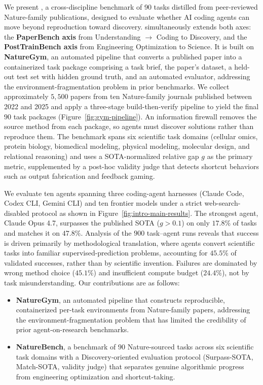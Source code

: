 We present \textbf{\benchmark}, a cross-discipline benchmark of 90 tasks distilled from peer-reviewed Nature-family publications, designed to evaluate whether AI coding agents can move beyond reproduction toward discovery.
\benchmark simultaneously extends both axes: the \textbf{PaperBench axis} from Understanding $\to$ Coding to Discovery, and the \textbf{PostTrainBench axis} from Engineering Optimization to Science.
It is built on \textbf{NatureGym}, an automated pipeline that converts a published paper into a containerized task package comprising a task brief, the paper's dataset, a held-out test set with hidden ground truth, and an automated evaluator, addressing the environment-fragmentation problem in prior benchmarks.
We collect approximately $5{,}500$ papers from ten Nature-family journals published between 2022 and 2025 and apply a three-stage build-then-verify pipeline to yield the final $90$ task packages (Figure~\ref{fig:gym-pipeline}).
An information firewall removes the source method from each package, so agents must discover solutions rather than reproduce them.
The benchmark spans six scientific task domains (cellular omics, protein biology, biomedical modeling, physical modeling, molecular design, and relational reasoning) and uses a SOTA-normalized relative gap $g$ as the primary metric, supplemented by a post-hoc validity judge that detects shortcut behaviors such as output fabrication and feedback gaming.

We evaluate ten agents spanning three coding-agent harnesses (Claude Code, Codex CLI, Gemini CLI) and ten frontier models under a strict web-search-disabled protocol as shown in Figure~\ref{fig:intro-main-results}.
The strongest agent, Claude Opus 4.7, surpasses the published SOTA ($g > 0.1$) on only $17.8\%$ of tasks and matches it on $47.8\%$.
Analysis of the $900$ task--agent runs reveals that success is driven primarily by methodological translation, where agents convert scientific tasks into familiar supervised-prediction problems, accounting for $45.5\%$ of validated successes, rather than by scientific invention.
Failures are dominated by wrong method choice ($45.1\%$) and insufficient compute budget ($24.4\%$), not by task misunderstanding.
Our contributions are as follows:
\begin{itemize}[leftmargin=1em, itemsep=2pt, topsep=4pt]
    \item \textbf{NatureGym}, an automated pipeline that constructs reproducible, containerized per-task environments from Nature-family papers, addressing the environment-fragmentation problem that has limited the credibility of prior agent-on-research benchmarks.
    \item \textbf{NatureBench}, a benchmark of $90$ Nature-sourced tasks across six scientific task domains with a Discovery-oriented evaluation protocol (Surpass-SOTA, Match-SOTA, validity judge) that separates genuine algorithmic progress from engineering optimization and shortcut-taking.
\end{itemize}
